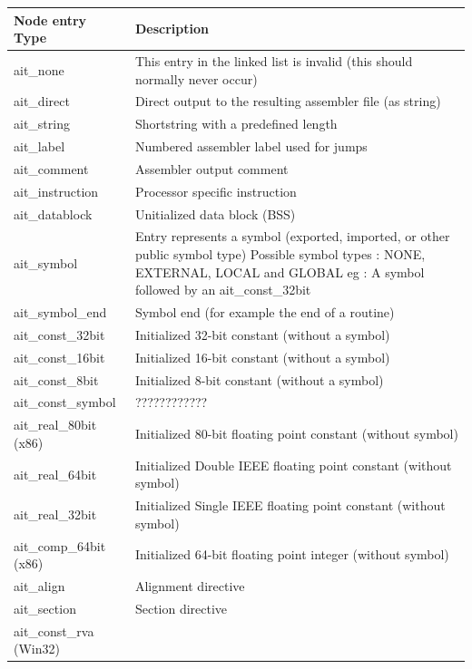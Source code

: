 \documentclass [12pt]{article}
\begin{document}
\begin{longtable}{|l|p{10cm}|}
\hline
Node entry Type   & Description \\
\hline
\endhead
\hline
\endfoot
ait{\_}none& 
    This entry in the linked list is invalid (this should
    normally never occur) \\
ait{\_}direct& 
    Direct output to the resulting assembler file (as string) \\
ait{\_}string& 
    Shortstring with a predefined length \\
ait{\_}label& 
    Numbered assembler label used for jumps \\
ait{\_}comment& 
    Assembler output comment \\
ait{\_}instruction& 
    Processor specific instruction \\
ait{\_}datablock& 
    Unitialized data block (BSS) \\
ait{\_}symbol& 
    Entry represents a symbol (exported, imported, or other public
    symbol type) \newline
    Possible symbol types : NONE, EXTERNAL, LOCAL and GLOBAL \newline
    eg : A symbol followed by an ait{\_}const{\_}32bit \\
ait{\_}symbol{\_}end & 
    Symbol end (for example the end of a routine) \\
ait{\_}const{\_}32bit& 
    Initialized 32-bit constant (without a symbol) \\
ait{\_}const{\_}16bit&
    Initialized 16-bit constant (without a symbol) \\
ait{\_}const{\_}8bit& 
    Initialized 8-bit constant (without a symbol) \\
ait{\_}const{\_}symbol & ???????????? \\
ait{\_}real{\_}80bit (x86)& 
    Initialized 80-bit floating point constant (without symbol) \\
ait{\_}real{\_}64bit& 
    Initialized Double IEEE floating point constant (without symbol) \\
ait{\_}real{\_}32bit& 
    Initialized Single IEEE floating point constant (without symbol) \\
ait{\_}comp{\_}64bit (x86)& 
    Initialized 64-bit floating point integer (without symbol) \\
ait{\_}align& 
    Alignment directive \\
ait{\_}section& 
    Section directive \\
ait{\_}const{\_}rva (Win32)&  \\

\end{longtable}
\end{document}
